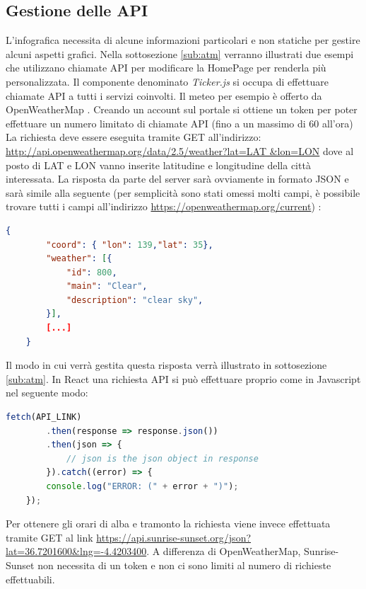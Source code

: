 \subsection{Gestione delle API}
\noindent L'infografica necessita di alcune informazioni particolari e non statiche per gestire alcuni aspetti grafici.
Nella sottosezione \ref{sub:atm} verranno illustrati due esempi che utilizzano chiamate API per modificare la HomePage per renderla più personalizzata.\newline
Il componente denominato \textit{Ticker.js} si occupa di effettuare chiamate API a tutti i servizi coinvolti.
Il meteo per esempio è offerto da OpenWeatherMap \cite{openWeather}. Creando un account sul portale si ottiene un token per poter effettuare un numero limitato di chiamate API (fino a un massimo di 60 all'ora)
La richiesta deve essere eseguita tramite GET all'indirizzo:\newline 
\url{http://api.openweathermap.org/data/2.5/weather?lat=LAT &lon=LON}
dove al posto di LAT e LON vanno inserite latitudine e longitudine della città interessata.\newline
La risposta da parte del server sarà ovviamente in formato JSON e sarà simile alla seguente (per semplicità sono stati omessi molti campi, è possibile trovare tutti i campi all'indirizzo \url{https://openweathermap.org/current}) \cite{openweatherGuide}:
\begin{lstlisting}[language=json, numbers=none]
    {
        "coord": { "lon": 139,"lat": 35},
        "weather": [{
            "id": 800,
            "main": "Clear",
            "description": "clear sky",
        }],
        [...]
    }
\end{lstlisting}
Il modo in cui verrà gestita questa risposta verrà illustrato in sottosezione \ref{sub:atm}.\newline
In React una richiesta API si può effettuare proprio come in Javascript nel seguente modo:
\begin{lstlisting}[language=Javascript]
    fetch(API_LINK)
        .then(response => response.json())
        .then(json => {
            // json is the json object in response
        }).catch((error) => {
        console.log("ERROR: (" + error + ")");
    });
\end{lstlisting}
Per ottenere gli orari di alba e tramonto la richiesta viene invece effettuata tramite GET al link \url{https://api.sunrise-sunset.org/json?lat=36.7201600&lng=-4.4203400}. A differenza di OpenWeatherMap, Sunrise-Sunset non necessita di un token e non ci sono limiti al numero di richieste effettuabili.
